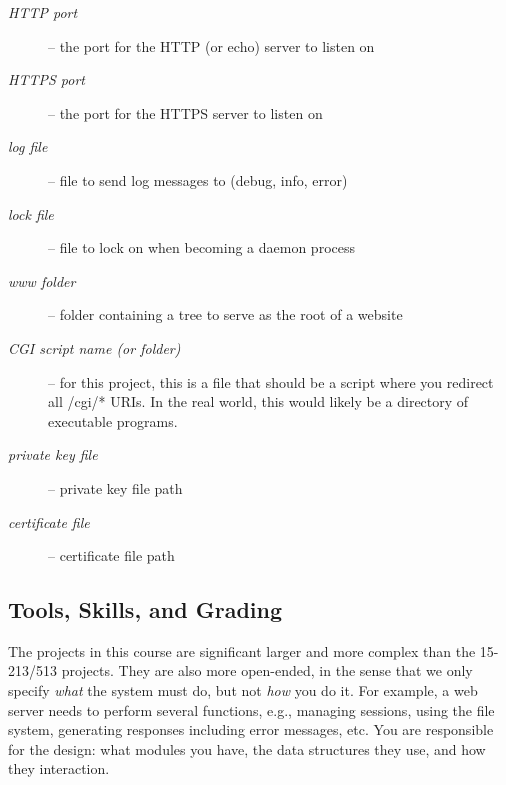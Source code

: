 \begin{description}
	\item[\textnormal{\emph{HTTP port}}] -- the port for the HTTP (or echo) server
                                          to listen on

	\item[\textnormal{\emph{HTTPS port}}] -- the port for the HTTPS server to
                                           listen on

	\item[\textnormal{\emph{log file}}] -- file to send log messages to
                                         (debug, info, error)

	\item[\textnormal{\emph{lock file}}] -- file to lock on when becoming a daemon
                                          process

	\item[\textnormal{\emph{www folder}}] -- folder containing a tree to serve as
                                           the root of a website

	\item[\textnormal{\emph{CGI script name (or folder)}}] --
										   for this project, this is a file that should be
										   a script where you redirect all
										   /cgi/* URIs. In the real world, this
										   would likely be a directory of
										   executable programs.

	\item[\textnormal{\emph{private key file}}] -- private key file path

	\item[\textnormal{\emph{certificate file}}] -- certificate file path
\end{description}


\subsection{Tools, Skills, and Grading}
The projects in this course are significant larger and more complex
than the 15-213/513 projects.  They are also more open-ended, in the
sense that we only specify \emph{what} the system must do, but not
\emph{how} you do it.  For example, a web server needs to perform several 
functions, e.g., managing sessions, using the file system, generating
responses including error messages, etc.  You are responsible for the 
design: what modules you have, the data structures they use, and how they
interaction.

